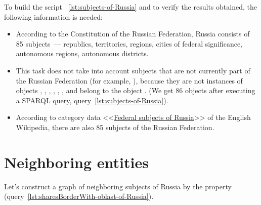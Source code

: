 To build the script ~\protect\ref{lst:subjects-of-Russia} and to verify the results obtained, the following information is needed:
\begin{itemize}
\item According to the Constitution of the Russian Federation, Russia consists of 85 subjects~--- republics, territories, regions, cities of federal significance, autonomous regions, autonomous districts.
  \item This task does not take into account subjects that are not currently part of the Russian Federation (for example, ), because they are not instances of objects , , , , , , and belong to the object . (We get 86 objects after executing a SPARQL query, query~\protect\ref{lst:subjects-of-Russia}).
  \item According to category data <<\href{https://en.wikipedia.org/wiki/Category:Federal_subjects_of_Russia-related_lists}{Federal subjects of Russia}>> of the English Wikipedia, there are also 85 subjects of the Russian Federation.
\end{itemize}

\section{Neighboring entities}

Let's construct a graph of neighboring subjects of Russia by the property  (query~\protect\ref{lst:sharesBorderWith-oblast-of-Russia}).

